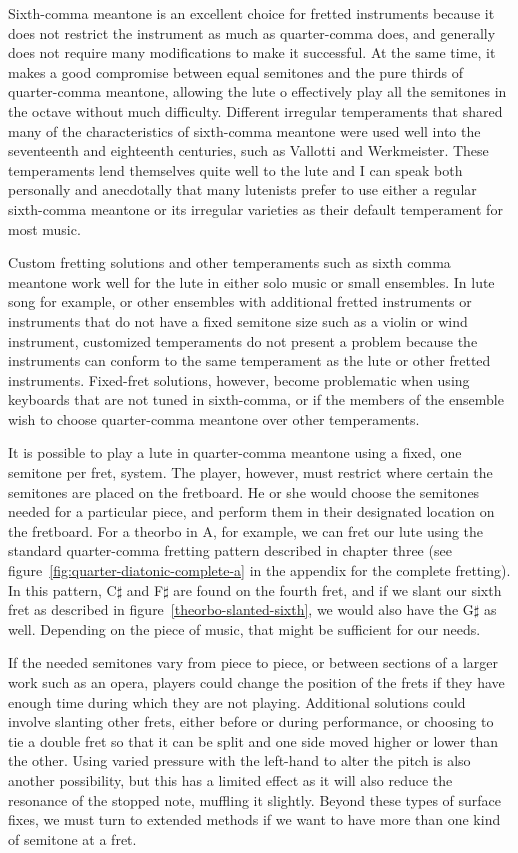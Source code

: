 Sixth-comma meantone is an excellent choice for fretted instruments because it does not
restrict the instrument as much as quarter-comma does, and generally does not require
many modifications to make it successful. At the same time, it makes a good compromise
between equal semitones and the pure thirds of quarter-comma meantone, allowing the
lute o effectively play all the semitones in the octave without much difficulty.
Different irregular temperaments that shared many of the characteristics of sixth-comma
meantone were used well into the seventeenth and eighteenth centuries, such as Vallotti
and Werkmeister. These temperaments lend themselves quite well to the lute and I can
speak both personally and anecdotally that many lutenists prefer to use either a
regular sixth-comma meantone or its irregular varieties as their default temperament
for most music.

Custom fretting solutions and other temperaments such as sixth comma meantone work well
for the lute in either solo music or small ensembles.  In lute song for example, or
other ensembles with additional fretted instruments or instruments that do not have a
fixed semitone size such as a violin or wind instrument, customized temperaments do not
present a problem because the instruments can conform to the same temperament as the
lute or other fretted instruments. Fixed-fret solutions, however, become problematic
when using keyboards that are not tuned in sixth-comma, or if the members of the
ensemble wish to choose quarter-comma meantone over other temperaments.

It is possible to play a lute in quarter-comma meantone using a fixed, one semitone per
fret, system.  The player, however, must restrict where certain the semitones are
placed on the fretboard.  He or she would choose the semitones needed for a particular
piece, and perform them in their designated location on the fretboard.  For a theorbo
in A, for example, we can fret our lute using the standard quarter-comma fretting
pattern described in chapter three (see figure~\ref{fig:quarter-diatonic-complete-a}
in the appendix for the complete fretting).  In this pattern, C$\sharp$ and F$\sharp$
are found on the fourth fret, and if we slant our sixth fret as described in
figure~\ref{theorbo-slanted-sixth}, we would also have the G$\sharp$ as well. Depending
on the piece of music, that might be sufficient for our needs.

If the needed semitones vary from piece to piece, or between sections of a larger work
such as an opera, players could change the position of the frets if they have enough
time during which they are not playing. Additional solutions could involve slanting
other frets, either before or during performance, or choosing to tie a double fret so
that it can be split and one side moved higher or lower than the other. Using varied
pressure with the left-hand to alter the pitch is also another possibility, but this
has a limited effect as it will also reduce the resonance of the stopped note, muffling
it slightly. Beyond these types of surface fixes, we must turn to extended methods if
we want to have more than one kind of semitone at a fret.

